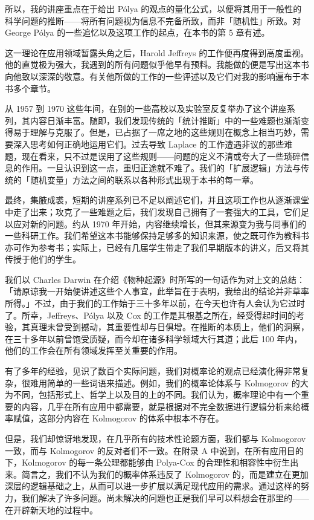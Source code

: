 所以，我的讲座重点在于给出 Pólya 的观点的量化公式，以便将其用于一般性的科学问题的推断——将所有问题视为信息不完备所致，而非「随机性」所致。对 George Pólya 的一些追忆以及这项工作的起点，在本书的第 5 章有述。

这一理论在应用领域暂露头角之后，Harold Jeffreys 的工作便再度得到高度重视。他的直觉极为强大，我遇到的所有问题似乎他早有预料。我能做的便是写出这本书向他致以深深的敬意。有关他所做的工作的一些评述以及它们对我的影响遍布于本书多个章节。

从 1957 到 1970 这些年间，在别的一些高校以及实验室反复举办了这个讲座系列，其内容日渐丰富。随即，我们发现传统的「统计推断」中的一些难题也渐渐变得易于理解与克服了。但是，已占据了一席之地的这些规则在概念上相当巧妙，需要深入思考如何正确地运用它们。过去导致 Laplace 的工作遭遇非议的那些难题，现在看来，只不过是误用了这些规则——问题的定义不清或夸大了一些琐碎信息的作用。一旦认识到这一点，重归正途就不难了。我们的「扩展逻辑」方法与传统的「随机变量」方法之间的联系以各种形式出现于本书的每一章。

最终，集腋成裘，短期的讲座系列已不足以阐述它们，并且这项工作也从逐渐课堂中走了出来；攻克了一些难题之后，我们发现自己拥有了一套强大的工具，它们足以应对新的问题。约从 1970 年开始，内容继续增长，但其来源变为我与同事们的一些科研工作。我们希望这本书能够保持足够多的知识来源，使之既可作为教科书亦可作为参考书；实际上，已经有几届学生带走了我们早期版本的讲义，后又将其传授于他们的学生。

我们以 Charles Darwin 在介绍《物种起源》时所写的一句话作为对上文的总结：「请原谅我一开始便讲述这些个人事宜，此举旨在于表明，我给出的结论并非草率所得。」不过，由于我们的工作始于三十多年以前，在今天也许有人会认为它过时了。所幸，Jeffreys、Pólya 以及 Cox 的工作是其根基之所在，经受得起时间的考验，其真理未曾受到撼动，其重要性却与日俱增。在推断的本质上，他们的洞察，在三十多年以前曾饱受质疑，而今却在诸多科学领域大行其道；此后 100 年内，他们的工作会在所有领域发挥至关重要的作用。


\subject{基础}

有了多年的经验，见识了数百个实际问题，我们对概率论的观点已经演化得非常复杂，很难用简单的一些词语来描述。例如，我们的概率论体系与 Kolmogorov 的大为不同，包括形式上、哲学上以及目的上的不同。我们认为，概率理论中有一个重要的内容，几乎在所有应用中都需要，就是根据对不完全数据进行逻辑分析来给概率赋值，这部分内容在 Kolmogorov 的体系中根本不存在。

但是，我们却惊讶地发现，在几乎所有的技术性论题方面，我们都与 Kolmogorov 一致，而与 Kolmogorov 的反对者们不一致。在附录 A 中说到，在所有应用目的下，Kolmogorov 的每一条公理都能够由 Polya-Cox 的合理性和相容性中衍生出来。简言之，我们不认为我们的概率体系违反了 Kolmogorov 的，而是建立在更加深层的逻辑基础之上，从而可以进一步扩展以满足现代应用的需求。通过这样的努力，我们解决了许多问题。尚未解决的问题也正是我们早可以料想会在那里的——在开辟新天地的过程中。

